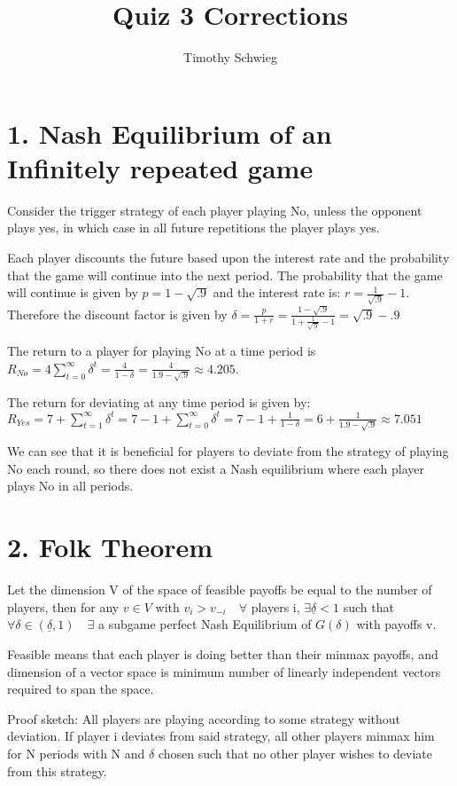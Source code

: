 \documentclass[10pt]{paper}
\title{Quiz 3 Corrections}
\author{Timothy Schwieg}
\begin{document}
\section*{1. Nash Equilibrium of an Infinitely repeated game}

Consider the trigger strategy of each player playing No, unless the
opponent plays yes, in which case in all future repetitions the player
plays yes.

Each player discounts the future based upon the interest rate and the
probability that the game will continue into the next period. The
probability that the game will continue is given by $p = 1 - \sqrt{ .9 }$ and
the interest rate is: $r = \frac{1}{\sqrt{.9}} - 1$. Therefore the
discount factor is given by $\delta = \frac{p}{1+r} = \frac{1 - \sqrt{.9}}{1 +
  \frac{1}{\sqrt{.9}}-1} = \sqrt{ .9 } - .9$

The return to a player for playing No at a time period is $R_{No} = 4
\sum_{t=0}^\infty \delta^t = \frac{4}{1-\delta} = \frac{4}{1.9 - \sqrt{ .9 }} \approx 4.205$.

The return for deviating at any time period is given by: $R_{Yes} = 7
+ \sum_{t=1}^\infty \delta^t = 7 - 1 + \sum_{t=0}^\infty \delta^t = 7 - 1 + \frac{1}{1-\delta} = 6 +
\frac{1}{1.9 - \sqrt{.9}} \approx 7.051$

We can see that it is beneficial for players to deviate from the
strategy of playing No each round, so there does not exist a Nash
equilibrium where each player plays No in all periods.

\section*{2. Folk Theorem}

Let the dimension V of the space of feasible payoffs be equal to the
number of players, then for any $v \in V$ with $v_i > v_{-i} \quad \forall$
players i, $\exists \underline{\delta} < 1$ such that $\forall \delta \in ( \underline{\delta},1) \quad
\exists$ a subgame perfect Nash Equilibrium of $G(\delta)$ with payoffs v.

Feasible means that each player is doing better than their minmax
payoffs, and dimension of a vector space is minimum number of linearly
independent vectors required to span the space. 

Proof sketch: All players are playing according to some strategy
without deviation. If player i deviates from said strategy, all other
players minmax him for N periods with N and $\delta$ chosen such that no
other player wishes to deviate from this strategy.
\end{document}
